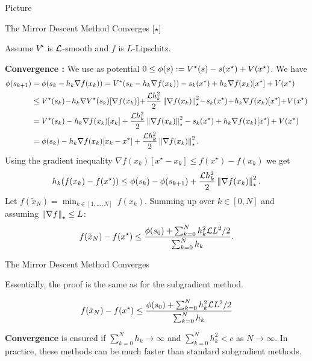 \documentclass[9pt]{beamer}
\begin{document}
\begin{frame}{Picture}
\end{frame}

\begin{frame}{The Mirror Descent Method Converges [$\star$]}

  Assume $V^\star$ is $\mathcal L$-smooth and $f$ is $L$-Lipschitz.

  \vfill

  \textbf{Convergence :} We use as potential $0 \leq \phi(s) := V^\star(s) - s(x^\star) + V(x^\star)$. We have
  \begin{align*}
    \phi(s_{k+1}) & = \phi(s_k-h_k \nabla f(x_k)) = V^\star(s_k-h_k\nabla f(x_k)) -s_k(x^\star) + h_k \nabla f(x_k)[x^\star] + V(x^\star) \\
                  & \leq V^\star(s_k) \!-\! h_k \nabla V^\star(s_k)[\nabla f(x_k)] \!+\! \frac{\mc L h_k^2}{2} \norm{\nabla f(x_k)}^2_\star \!-\! s_k(x^\star) \!+\! h_k \nabla f(x_k)[x^\star] \!+\! V(x^\star)\\
                  & = V^\star(s_k) - h_k \nabla f(x_k)[x_k] + \frac{\mc L h_k^2}{2} \norm{\nabla f(x_k)}^2_\star - s_k(x^\star) + h_k \nabla f(x_k)[x^\star]+V(x^\star) \\
                  & = \phi(s_k)- h_k \nabla f(x_k)[x_k-x^\star] + \frac{\mc L h_k^2}{2} \norm{\nabla f(x_k)}^2_\star.
  \end{align*}
  Using the gradient inequality $\nabla f(x_k)[x^\star-x_k]\leq f(x^\star)-f(x_k)$ we get
  \[
    h_k (f(x_k)-f(x^\star))\leq \phi(s_k) - \phi(s_{k+1}) + \frac{\mathcal L h_k^2}{2} \left\|\nabla f(x_k)\right\|^2_\star.
  \]
  Let $f(\tilde x_N) = \min_{k\in [1, \dots, N]}~f(x_k)$.
  Summing up over $k\in[0, N]$ and assuming $\left\|\nabla f\right\|_\star \leq L$:
  \[
    f(\tilde x_N) - f(x^\star) \leq \frac{\phi(s_0) + \sum_{k=0}^N h^2_k \mathcal L L^2/2 }{\sum_{k=0}^N h_k}.
  \]

\end{frame}

\begin{frame}{The Mirror Descent Method Converges}

  Essentially, the proof is the same as for the subgradient method.

  \begin{center}
    \begin{tcolorbox}
      \[
        f(\tilde x_N) - f(x^\star) \leq \frac{\phi(s_0) + \sum_{k=0}^N h^2_k \mathcal L L^2/2 }{\sum_{k=0}^N h_k}
      \]
    \end{tcolorbox}
  \end{center}


  \vfill
  \textbf{Convergence} is ensured if $\sum_{k=0}^N h_k \to \infty$ and $\sum_{k=0}^N h_k^2 < c$ as $N\to \infty$. In practice, these methods can be much faster than standard subgradient methods.

\end{frame}
\end{document}
